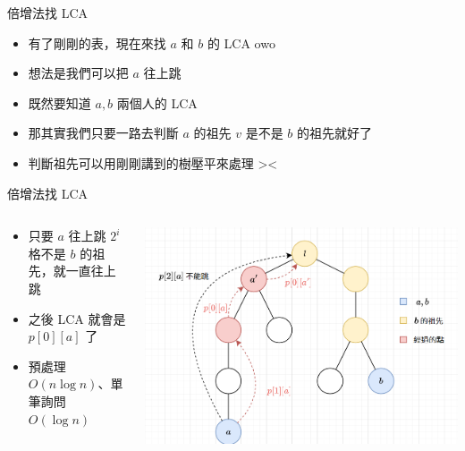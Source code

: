 \documentclass[aspectratio=169]{beamer}
\begin{document}
    \begin{frame}{倍增法找 LCA}
        \begin{itemize}
            \item 有了剛剛的表，現在來找 $a$ 和 $b$ 的 LCA owo
            \item 想法是我們可以把 $a$ 往上跳
            \item 既然要知道 $a,b$ 兩個人的 LCA
            \item 那其實我們只要一路去判斷 $a$ 的祖先 $v$ 是不是 $b$ 的祖先就好了
            \item 判斷祖先可以用剛剛講到的樹壓平來處理 ><
        \end{itemize}
    \end{frame}
    
    \begin{frame}{倍增法找 LCA}
        \begin{columns}
            \begin{column}{0.65 \textwidth}
                \begin{itemize}
                    \item 只要 $a$ 往上跳 $2^i$ 格不是 $b$ 的祖先，就一直往上跳
                    \item 之後 LCA 就會是 $p[0][a]$ 了
                    \item<2-> 預處理$O(n \log n)$、單筆詢問$O(\log n)$
                \end{itemize}
            \end{column}
            \begin{column}{0.4 \textwidth}
                \begin{center}
                    \includegraphics[scale=0.25]{images/binary_lifting_lca.png}
                \end{center}
            \end{column}
        \end{columns}
    \end{frame}
    
\end{document}
